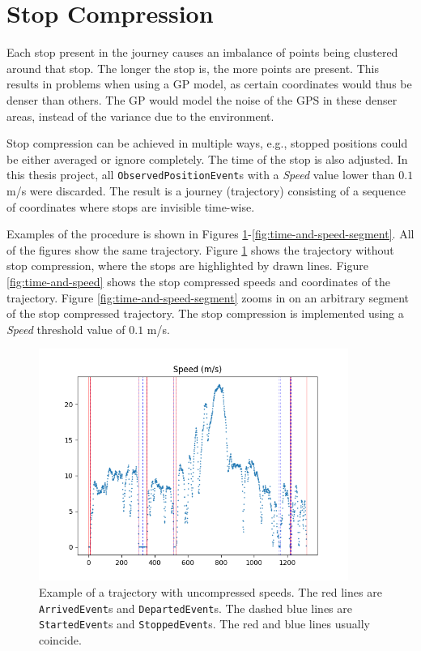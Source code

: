 \section{Stop Compression} \label{sec:stop-compression}
Each stop present in the journey causes an imbalance of points being clustered around that stop.
The longer the stop is, the more points are present.
This results in problems when using a GP model, as certain coordinates would thus be denser than others.
The GP would model the noise of the GPS in these denser areas, instead of the variance due to the environment.

Stop compression can be achieved in multiple ways, e.g., stopped positions could be either averaged or ignore completely.
The time of the stop is also adjusted.
In this thesis project, all \texttt{ObservedPositionEvent}s with a \textit{Speed} value lower than $0.1$ m/s were discarded.
The result is a journey (trajectory) consisting of a sequence of coordinates where stops are invisible time-wise.

Examples of the procedure is shown in Figures \ref{fig:uncompressed-events}-\ref{fig:time-and-speed-segment}.
All of the figures show the same trajectory.
Figure \ref{fig:uncompressed-events} shows the trajectory without stop compression, where the stops are highlighted by drawn lines.
Figure \ref{fig:time-and-speed} shows the stop compressed speeds and coordinates of the trajectory.
Figure \ref{fig:time-and-speed-segment} zooms in on an arbitrary segment of the stop compressed trajectory.
The stop compression is implemented using a \textit{Speed} threshold value of $0.1$ m/s.

\begin{figure}[h!]
    \centering
    \includegraphics[width=0.9\textwidth]{figures/speed_and_stops_filter_0}
    \caption[Example of a trajectory with uncompressed speeds]
    {\small Example of a trajectory with uncompressed speeds.
    The red lines are \texttt{ArrivedEvent}s and \texttt{DepartedEvent}s.
    The dashed blue lines are \texttt{StartedEvent}s and \texttt{StoppedEvent}s.
    The red and blue lines usually coincide.}
    \label{fig:uncompressed-events}
\end{figure}

